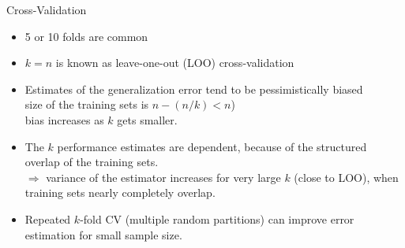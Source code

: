 \documentclass[11pt,compress,t,notes=noshow, xcolor=table]{beamer}
\begin{document}
\begin{vbframe}{Cross-Validation}

\begin{itemize}
  \item 5 or 10 folds are common%
  \item $k = n$ is known as leave-one-out (LOO) cross-validation
  \item Estimates of the generalization error tend to be pessimistically biased\\
    size of the training sets is $ n- (n/k) < n$)\\ 
    bias increases as $k$ gets smaller.
  \item The $k$ performance estimates are dependent, because
  of the structured overlap of the training sets.\\
  $\Rightarrow$ variance of the estimator increases for very large $k$ (close to LOO),
  when training sets nearly completely overlap.
  \item Repeated $k$-fold CV (multiple random partitions)
  can improve error estimation for small sample size.
\end{itemize}
\end{vbframe}
\end{document}
